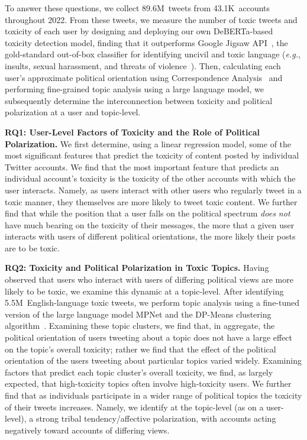 To answer these questions, we collect 89.6M~tweets from 43.1K~accounts throughout 2022. From these tweets, we measure the number of toxic tweets and toxicity of each user by designing and deploying our own DeBERTa-based~\cite{he2022debertav3} toxicity detection model, finding that it outperforms Google Jigsaw API~\cite{perspectiveapi}, the gold-standard out-of-box classifier for identifying uncivil and toxic language (\textit{e.g.}, insults, sexual harassment, and threats of violence~\cite{thomas2021sok}). Then, calculating each user's approximate political orientation using Correspondence Analysis~\cite{barbera2015tweeting} and performing fine-grained topic analysis using a large language model, we subsequently determine the interconnection between toxicity and political polarization at a user and topic-level.

\vspace{2pt}\noindent
\noindent
\textbf{RQ1: User-Level Factors of Toxicity and the Role of Political Polarization.} We first determine, using a linear regression model, some of the most significant features that predict the toxicity of content posted by individual Twitter accounts. We find that the most important feature that predicts an individual account's toxicity is the toxicity of the other accounts with which the user interacts. Namely, as users interact with other users who regularly tweet in a toxic manner, they themselves are more likely to tweet toxic content. We further find that while the position that a user falls on the political spectrum \emph{does not} have much bearing on the toxicity of their messages, the more that a given user interacts with users of different political orientations, the more likely their posts are to be toxic.  

\vspace{2pt}\noindent
\noindent
\textbf{RQ2: Toxicity and Political Polarization in Toxic Topics.} Having observed that users who interact with users of differing political views are more likely to be toxic, we examine this dynamic at a topic-level. After identifying 5.5M~English-language toxic tweets, we perform topic analysis using a fine-tuned version of the large language model MPNet and the DP-Means clustering algorithm~\cite{hanley2023partial}. Examining these topic clusters, we find that, in aggregate, the political orientation of users tweeting about a topic does not have a large effect on the topic's overall toxicity; rather we find that the effect of the political orientation of the users tweeting about particular topics varied widely. Examining factors that predict each topic cluster's overall toxicity, we find, as largely expected, that high-toxicity topics often involve high-toxicity users.  We further find that as individuals participate in a wider range of political topics the toxicity of their tweets increases. Namely, we identify at the topic-level (as on a user-level), a strong tribal tendency/affective polarization, with accounts acting negatively toward accounts of differing views. 

